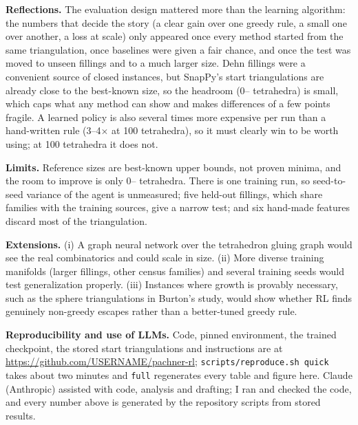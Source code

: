 \documentclass[10pt,a4paper]{article}
\newcommand{\repourl}{https://github.com/USERNAME/pachner-rl}
\begin{document}
\textbf{Reflections.} The evaluation design mattered more than the learning algorithm: the numbers that decide the story (a clear gain over one greedy rule, a small one over another, a loss at scale) only appeared once every method started from the same triangulation, once baselines were given a fair chance, and once the test was moved to unseen fillings and to a much larger size.
Dehn fillings were a convenient source of closed instances, but SnapPy's start triangulations are already close to the best-known size, so the headroom (0--\gapMax{} tetrahedra) is small, which caps what any method can show and makes differences of a few points fragile. A learned policy is also several times more expensive per run than a hand-written rule (3--4$\times$ at 100 tetrahedra), so it must clearly win to be worth using; at 100 tetrahedra it does not.

\textbf{Limits.} Reference sizes are best-known upper bounds, not proven minima, and the room to improve is only 0--\gapMax{} tetrahedra. There is one training run, so seed-to-seed variance of the agent is unmeasured; five held-out fillings, which share families with the training sources, give a narrow test; and six hand-made features discard most of the triangulation.

\textbf{Extensions.} (i) A graph neural network over the tetrahedron gluing graph would see the real combinatorics and could scale in size. (ii) More diverse training manifolds (larger fillings, other census families) and several training seeds would test generalization properly. (iii) Instances where growth is provably necessary, such as the sphere triangulations in Burton's study, would show whether RL finds genuinely non-greedy escapes rather than a better-tuned greedy rule.

\textbf{Reproducibility and use of LLMs.} Code, pinned environment, the trained checkpoint, the stored start triangulations and instructions are at \url{\repourl}; \texttt{scripts/reproduce.sh quick} takes about two minutes and \texttt{full} regenerates every table and figure here. Claude (Anthropic) assisted with code, analysis and drafting; I ran and checked the code, and every number above is generated by the repository scripts from stored results.
\end{document}
